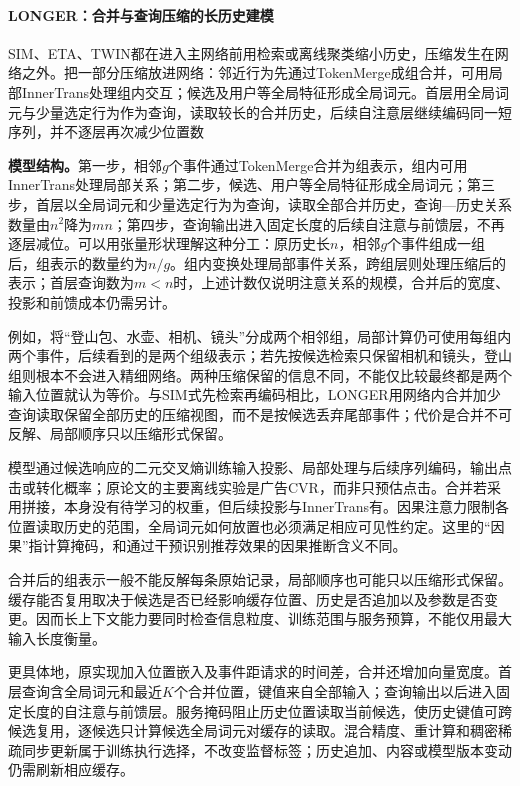 \paragraph{LONGER：合并与查询压缩的长历史建模}
\label{sec:rs-longer}

SIM、ETA、TWIN都在进入主网络前用检索或离线聚类缩小历史，压缩发生在网络之外。把一部分压缩放进网络：邻近行为先通过TokenMerge成组合并，可用局部InnerTrans处理组内交互；候选及用户等全局特征形成全局词元。首层用全局词元与少量选定行为作为查询，读取较长的合并历史，后续自注意层继续编码同一短序列，并不逐层再次减少位置数

\textbf{模型结构。}第一步，相邻$g$个事件通过TokenMerge合并为组表示，组内可用InnerTrans处理局部关系；第二步，候选、用户等全局特征形成全局词元；第三步，首层以全局词元和少量选定行为为查询，读取全部合并历史，查询—历史关系数量由$n^2$降为$mn$；第四步，查询输出进入固定长度的后续自注意与前馈层，不再逐层减位。可以用张量形状理解这种分工：原历史长$n$，相邻$g$个事件组成一组后，组表示的数量约为$n/g$。组内变换处理局部事件关系，跨组层则处理压缩后的表示；首层查询数为$m<n$时，上述计数仅说明注意关系的规模，合并后的宽度、投影和前馈成本仍需另计。

例如，将“登山包、水壶、相机、镜头”分成两个相邻组，局部计算仍可使用每组内两个事件，后续看到的是两个组级表示；若先按候选检索只保留相机和镜头，登山组则根本不会进入精细网络。两种压缩保留的信息不同，不能仅比较最终都是两个输入位置就认为等价。与SIM式先检索再编码相比，LONGER用网络内合并加少查询读取保留全部历史的压缩视图，而不是按候选丢弃尾部事件；代价是合并不可反解、局部顺序只以压缩形式保留。

模型通过候选响应的二元交叉熵训练输入投影、局部处理与后续序列编码，输出点击或转化概率；原论文的主要离线实验是广告CVR，而非只预估点击。合并若采用拼接，本身没有待学习的权重，但后续投影与InnerTrans有。因果注意力限制各位置读取历史的范围，全局词元如何放置也必须满足相应可见性约定。这里的“因果”指计算掩码，和通过干预识别推荐效果的因果推断含义不同。

合并后的组表示一般不能反解每条原始记录，局部顺序也可能只以压缩形式保留。缓存能否复用取决于候选是否已经影响缓存位置、历史是否追加以及参数是否变更。因而长上下文能力要同时检查信息粒度、训练范围与服务预算，不能仅用最大输入长度衡量。

更具体地，原实现加入位置嵌入及事件距请求的时间差，合并还增加向量宽度。首层查询含全局词元和最近$K$个合并位置，键值来自全部输入；查询输出以后进入固定长度的自注意与前馈层。服务掩码阻止历史位置读取当前候选，使历史键值可跨候选复用，逐候选只计算候选全局词元对缓存的读取。混合精度、重计算和稠密稀疏同步更新属于训练执行选择，不改变监督标签；历史追加、内容或模型版本变动仍需刷新相应缓存。

